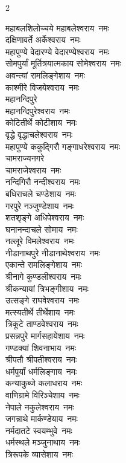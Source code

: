 \begin{multicols}{2}
\begin{flushleft}
महाबलशिलोच्चये महाबलेश्वराय~नमः\\
दक्षिणावर्ते अर्केश्वराय~नमः\\
महापुण्ये वेदारण्ये वेदारण्येश्वराय~नमः\\
सोमपुर्यां मूर्तित्रयात्मकाय  सोमेश्वराय~नमः\\
अवन्त्यां रामलिङ्गेशाय~नमः\hfill{}\\
काश्मीरे विजयेश्वराय~नमः\\
महानन्दिपुरे\\ महानन्दिपुरेश्वराय~नमः\\
कोटितीर्थे कोटीशाय~नमः\\
वृद्धे वृद्धाचलेश्वराय~नमः\\
महापुण्ये ककुद्गिरौ गङ्गाधरेश्वराय~नमः\\
चामराज्यनगरे\\ चामराजेश्वराय~नमः\\
नन्दिगिरौ नन्दीश्वराय~नमः\\
बधिराचले चण्डेशाय~नमः\\
गरपुरे नञ्जुण्डेशाय~नमः\\
शतशृङ्गे अधिपेश्वराय~नमः\hfill{}\\
घनानन्दाचले सोमाय~नमः\\
नल्लूरे विमलेश्वराय~नमः\\
नीडानाथपुरे नीडानाथेश्वराय~नमः\\
एकान्ते रामलिङ्गेशाय~नमः\\
श्रीनागे कुण्डलीश्वराय~नमः\\
श्रीकन्यायां त्रिभङ्गीशाय~नमः\\
उत्सङ्गे राघवेश्वराय~नमः\\
मत्स्यतीर्थे तीर्थेशाय~नमः\\
त्रिकूटे ताण्डवेश्वराय~नमः\\
प्रसन्नपुरे मार्गसहायेशाय~नमः\hfill{}\\
गण्डक्यां शिवनाभाय~नमः\\
श्रीपतौ श्रीपतीश्वराय~नमः\\
धर्मपुर्यां धर्मलिङ्गाय~नमः\\
कन्याकुब्जे कलाधराय~नमः\\
वाणिग्रामे विरिञ्चेशाय~नमः\\
नेपाले नकुलेश्वराय~नमः\\
जगन्नाथे मार्कण्डेयाय~नमः\\
नर्मदातटे स्वयम्भुवे~नमः\\
धर्मस्थले मञ्जुनाथाय~नमः\\
त्रिरूपके व्यासेशाय~नमः\hfill{}\\

\end{flushleft}
\end{multicols}
